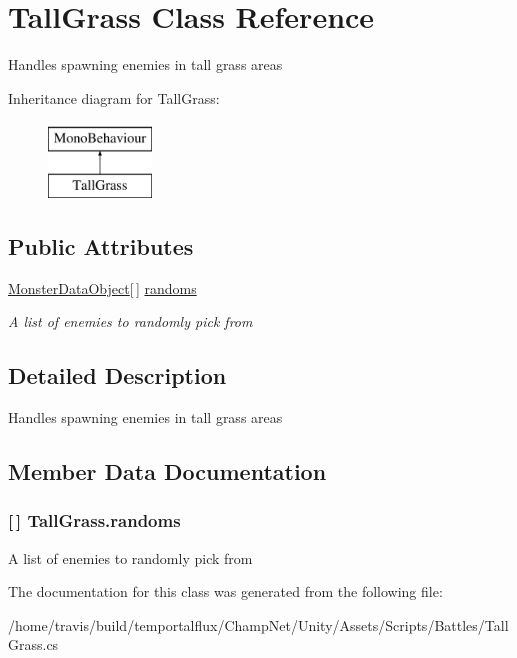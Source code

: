 \hypertarget{class_tall_grass}{\section{Tall\-Grass Class Reference}
\label{class_tall_grass}
}


Handles spawning enemies in tall grass areas  


Inheritance diagram for Tall\-Grass\-:\begin{figure}[H]
\begin{center}
\leavevmode
\includegraphics[height=2.000000cm]{class_tall_grass}
\end{center}
\end{figure}
\subsection*{Public Attributes}
\begin{DoxyCompactItemize}
\item 
\hyperlink{class_monster_data_object}{Monster\-Data\-Object}\mbox{[}$\,$\mbox{]} \hyperlink{class_tall_grass_a694a979d07a06888b80f8b27ea56953d}{randoms}
\begin{DoxyCompactList}\small\item\em A list of enemies to randomly pick from \end{DoxyCompactList}\end{DoxyCompactItemize}


\subsection{Detailed Description}
Handles spawning enemies in tall grass areas 



\subsection{Member Data Documentation}
\hypertarget{class_tall_grass_a694a979d07a06888b80f8b27ea56953d}{
\subsubsection[{randoms}]{ \mbox{[}$\,$\mbox{]} Tall\-Grass.\-randoms}}\label{class_tall_grass_a694a979d07a06888b80f8b27ea56953d}


A list of enemies to randomly pick from 



The documentation for this class was generated from the following file\-:\begin{DoxyCompactItemize}
\item 
/home/travis/build/temportalflux/\-Champ\-Net/\-Unity/\-Assets/\-Scripts/\-Battles/Tall\-Grass.\-cs\end{DoxyCompactItemize}
